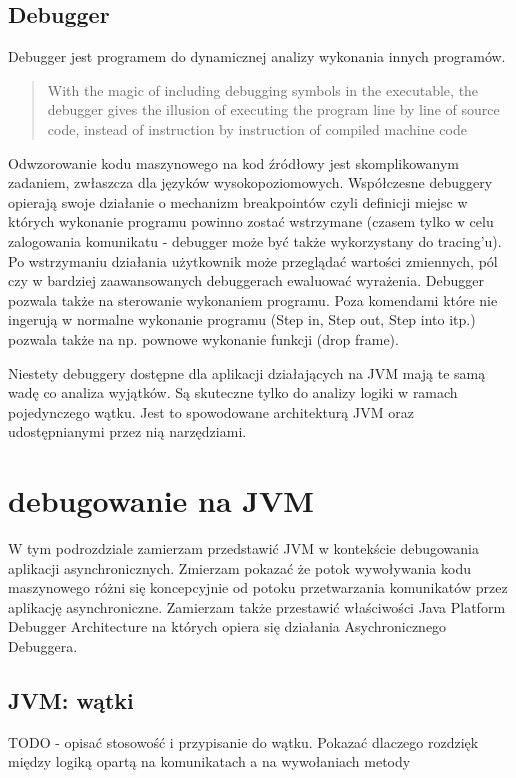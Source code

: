 \subsection{Debugger}
Debugger jest programem do dynamicznej analizy wykonania innych programów. 
\begin{quote}
    With the magic of including debugging symbols in the executable, the debugger gives the illusion of executing the program line by line of source code, instead of instruction by instruction of compiled machine code~\cite{artOfDebugging}
\end{quote}
Odwzorowanie kodu maszynowego na kod źródłowy jest skomplikowanym zadaniem, zwłaszcza dla języków wysokopoziomowych. Współczesne debuggery opierają swoje działanie o mechanizm breakpointów czyli definicji miejsc w których wykonanie programu powinno zostać wstrzymane (czasem tylko w celu zalogowania komunikatu - debugger może być także wykorzystany do tracing'u). Po wstrzymaniu działania użytkownik może przeglądać wartości zmiennych, pól czy w bardziej zaawansowanych debuggerach ewaluować wyrażenia.
Debugger pozwala także na sterowanie wykonaniem programu. Poza komendami które nie ingerują w normalne wykonanie programu (Step in, Step out, Step into itp.) pozwala także na np. pownowe wykonanie funkcji (drop frame).

Niestety debuggery dostępne dla aplikacji działających na JVM mają te samą wadę co analiza wyjątków. Są skuteczne tylko do analizy logiki w ramach pojedynczego wątku. Jest to spowodowane architekturą JVM oraz udostępnianymi przez nią narzędziami.

\section{debugowanie na JVM}

W tym podrozdziale zamierzam przedstawić JVM w kontekście debugowania aplikacji asynchronicznych. Zmierzam pokazać że potok wywoływania kodu maszynowego różni się koncepcyjnie od potoku przetwarzania komunikatów przez aplikację asynchroniczne. Zamierzam także przestawić właściwości Java Platform Debugger Architecture na których opiera się działania Asychronicznego Debuggera.

\subsection{JVM: wątki}

TODO - opisać stosowość i przypisanie do wątku. Pokazać dlaczego rozdzięk między logiką opartą na komunikatach a na wywołaniach metody

